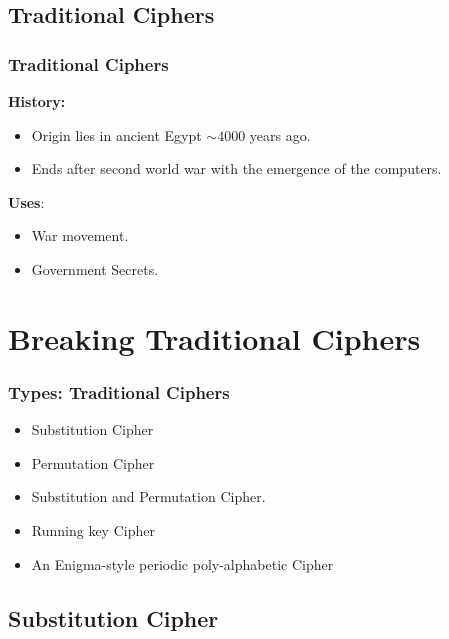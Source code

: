 \documentclass{uva-inf-presentation}
\begin{document}
\subsection{Traditional Ciphers}

\begin{frame}
\frametitle{Traditional Ciphers}
\textbf{History:}
\begin{itemize}
    \item Origin lies in ancient Egypt $\sim4000$ years ago. %
    \item Ends after second world war with the emergence of the computers.
\end{itemize}
\textbf{Uses}:
\begin{itemize}
    \item War movement.
    \item Government Secrets.
\end{itemize}
\end{frame}

\section{Breaking Traditional Ciphers}

\begin{frame}
\frametitle{Types: Traditional Ciphers}
\begin{itemize}
    \item Substitution Cipher
    \item Permutation Cipher
    \item Substitution and Permutation Cipher.
    \item Running key Cipher
    \item An Enigma-style periodic poly-alphabetic Cipher
\end{itemize}
\end{frame}

\subsection{Substitution Cipher}
\frame{\tableofcontents[currentsubsection]}
\end{document}
